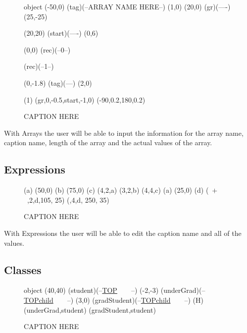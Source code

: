 \documentclass[10pt,a4paper,english]{article}
\begin{document}
\begin {figure}[!htbp]

\Draw

 {object}
\Move(-50,0)
\Node(tag)(--ARRAY NAME HERE--)
\MoveToExit(1,0)
\Move(20,0)
\ORectNode(gr)(----)
\Move (25,-25)

\MinNodeSize(20,20)
\Node(start)(----)
\Do(0,6)
{  
	\IF 
    	\EqInt(0,0) 				
        	\THEN
 				\RectNode(rec)(--0--)
            
   \ELSE
   		\RectNode(rec)(--1--)
   		
 		   \FI
   { 	\MoveToExit(0,-1.8)
 	\Node(tag)(--\DoReg--)
   }
   \MoveToExit(2,0)
}
\ArrowHeads(1)
\CurvedEdgeAt(gr,0,-0.5,start,-1,0) (-90,0.2,180,0.2)
\EndDraw
\caption {CAPTION HERE}
\label {fig:array}
\end {figure}

With Arrays the user will be able to input the information for the array name, caption name, length of the array and the actual values of the array.  

\subsection*{Expressions}

\begin {figure}[!htbp]
\Draw


\MarkLoc(a)
\Move(50,0)
\MarkLoc(b)
\Move(75,0)
\MarkLoc(c)
\boxItDefault(4,2,a)
\boxItDefault(3,2,b)
\boxItDefault(4,4,c)
\MoveToLoc(a)
\Move(25,0)
\MarkLoc(d)
\boxIt(~$  +  $~,2,d,105, 25)
\boxIt(\hspace{135pt}\hfill*\hspace{10pt},4,d, 250, 35)
\EndDraw
\caption {CAPTION HERE }
\label {fig:exprsBoxedAmb1}
\end {figure}

With Expressions the user will be able to edit the caption name and all of the values.

\subsection*{Classes}

\begin {figure}[!htbp]
\Draw
 {object}
\MinNodeSize(40,40)
\RectNode (student)(--\underline {TOP}~~~~--)
\MoveToExit(-2,-3)
\RectNode (underGrad)(--\underline {TOPchild}~~~~--)
\MoveToExit(3,0)
\RectNode (gradStudent)(--\underline {TOPchild}~~~~--)
\ArrowSpec (H)
\Edge(underGrad,student)
\Edge(gradStudent,student)
\EndDraw
\caption {CAPTION HERE}
\label {fig:studentClasses}
\end {figure}
\end{document}
